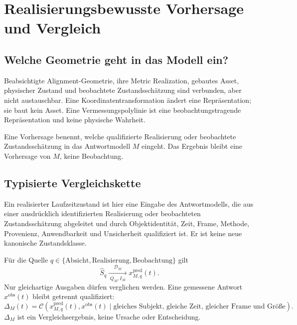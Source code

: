 \chapter{Realisierungsbewusste Vorhersage und Vergleich}
\label{chap:realization-aware-dynamics}

\section*{Welche Geometrie geht in das Modell ein?}

Beabsichtigte Alignment-Geometrie, ihre Metric Realization, gebautes Asset,
physischer Zustand und beobachtete Zustandsschätzung sind verbunden, aber
nicht austauschbar. Eine Koordinatentransformation ändert eine
Repräsentation; sie baut kein Asset. Eine Vermessungspolylinie ist eine
beobachtungstragende Repräsentation und keine physische Wahrheit.

\begin{principle}
\label{princ:realization-aware-dynamics}
Eine Vorhersage benennt, welche qualifizierte Realisierung oder beobachtete
Zustandsschätzung in das Antwortmodell \(M\) eingeht. Das Ergebnis bleibt
eine Vorhersage von \(M\), keine Beobachtung.
\end{principle}

\section{Typisierte Vergleichskette}

\begin{definition}
\label{def:realized-runtime-state}
Ein realisierter Laufzeitzustand ist hier eine Eingabe des Antwortmodells, die
aus einer ausdrücklich identifizierten Realisierung oder beobachteten
Zustandsschätzung abgeleitet und durch Objektidentität, Zeit, Frame, Methode,
Provenienz, Anwendbarkeit und Unsicherheit qualifiziert ist. Er ist keine
neue kanonische Zustandsklasse.
\end{definition}

Für die Quelle \(q\in\{\mathrm{Absicht},\mathrm{Realisierung},
\mathrm{Beobachtung}\}\) gilt
\[
\widehat S_q
\xrightarrow[\;Q_M,I_M\;]{\mathcal D_M}
x_{M,q}^{\mathrm{pred}}(t).
\]
Nur gleichartige Ausgaben dürfen verglichen werden. Eine gemessene Antwort
\(x^{\mathrm{obs}}(t)\) bleibt getrennt qualifiziert:
\[
\Delta_M(t)=
\mathcal C\!\left(x_{M,q}^{\mathrm{pred}}(t),
x^{\mathrm{obs}}(t)\mid
\text{gleiches Subjekt, gleiche Zeit, gleicher Frame und Größe}\right).
\]
\(\Delta_M\) ist ein Vergleichsergebnis, keine Ursache oder Entscheidung.

